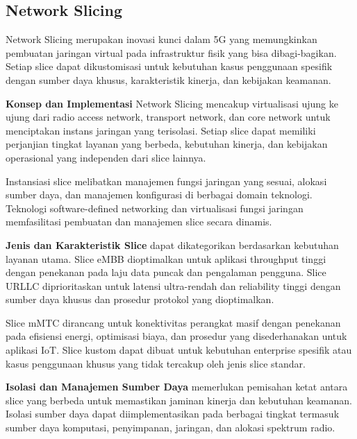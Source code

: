 \subsection{Network Slicing}

Network Slicing merupakan inovasi kunci dalam 5G yang memungkinkan pembuatan jaringan virtual pada infrastruktur fisik yang bisa dibagi-bagikan. Setiap slice dapat dikustomisasi untuk kebutuhan kasus penggunaan spesifik dengan sumber daya khusus, karakteristik kinerja, dan kebijakan keamanan.


\textbf{Konsep dan Implementasi} Network Slicing mencakup virtualisasi ujung ke ujung dari radio access network, transport network, dan core network untuk menciptakan instans jaringan yang terisolasi. Setiap slice dapat memiliki perjanjian tingkat layanan yang berbeda, kebutuhan kinerja, dan kebijakan operasional yang independen dari slice lainnya.

Instansiasi slice melibatkan manajemen fungsi jaringan yang sesuai, alokasi sumber daya, dan manajemen konfigurasi di berbagai domain teknologi. Teknologi software-defined networking dan virtualisasi fungsi jaringan memfasilitasi pembuatan dan manajemen slice secara dinamis.

\textbf{Jenis dan Karakteristik Slice} dapat dikategorikan berdasarkan kebutuhan layanan utama. Slice eMBB dioptimalkan untuk aplikasi throughput tinggi dengan penekanan pada laju data puncak dan pengalaman pengguna. Slice URLLC diprioritaskan untuk latensi ultra-rendah dan reliability tinggi dengan sumber daya khusus dan prosedur protokol yang dioptimalkan.

Slice mMTC dirancang untuk konektivitas perangkat masif dengan penekanan pada efisiensi energi, optimisasi biaya, dan prosedur yang disederhanakan untuk aplikasi IoT. Slice kustom dapat dibuat untuk kebutuhan enterprise spesifik atau kasus penggunaan khusus yang tidak tercakup oleh jenis slice standar.

\textbf{Isolasi dan Manajemen Sumber Daya} memerlukan pemisahan ketat antara slice yang berbeda untuk memastikan jaminan kinerja dan kebutuhan keamanan. Isolasi sumber daya dapat diimplementasikan pada berbagai tingkat termasuk sumber daya komputasi, penyimpanan, jaringan, dan alokasi spektrum radio.

